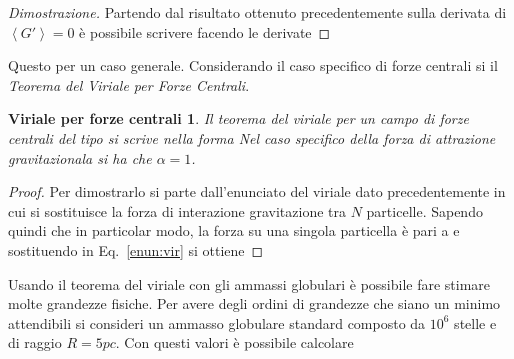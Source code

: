 \begin{proof}[Dimostrazione]
Partendo dal risultato ottenuto precedentemente sulla derivata di $\left\langle G' \right\rangle=0$ \`e possibile scrivere
facendo le derivate
\end{proof}
Questo per un caso generale. Considerando il caso specifico di forze centrali si il \emph{Teorema del Viriale per Forze Centrali}.
\newtheorem*{mydef2}{Viriale per forze centrali}
\begin{mydef2}
Il teorema del viriale per un campo di forze centrali del tipo 
si scrive nella forma
Nel caso specifico della forza di attrazione gravitazionala si ha che $\alpha=1$.
\end{mydef2}
\begin{proof}
Per dimostrarlo si parte dall'enunciato del viriale dato precedentemente in cui si sostituisce la forza di interazione gravitazione tra $N$ particelle. Sapendo quindi che
in particolar modo, la forza su una singola particella \`e pari a
e sostituendo in Eq.~\ref{enun:vir} si ottiene
\end{proof}
Usando il teorema del viriale con gli ammassi globulari \`e possibile fare stimare molte grandezze fisiche. Per avere degli ordini di grandezze che siano un minimo attendibili si consideri un ammasso globulare standard composto da $10^6$ stelle e di raggio $R=5pc$. Con questi valori \`e possibile calcolare
